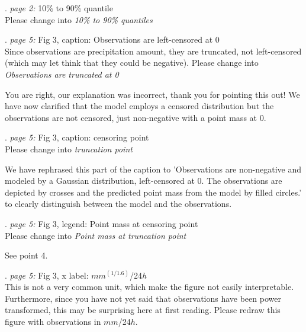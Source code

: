 \documentclass[american,foldmarks=false,noconfig]{uibklttr}
\newenvironment{review}{\fontshape{\itdefault}\fontseries{\bfdefault} \selectfont \smallskip}{\par}
\begin{document}
\begin{review}
2. {\color{quotecolor}\textit{page 2:} 10$\%$ to 90\% quantile}\\
Please change into \textit{10\% to 90\% quantiles}
\end{review}

\begin{review}
3. {\color{quotecolor}\textit{page 5:} Fig 3, caption: Observations 
are left-censored at 0}\\
Since observations are precipitation amount, they are truncated, not 
left-censored (which may let think that they could be negative). 
Please change into \textit{Observations are truncated at 0}
\end{review}

You are right, our explanation was incorrect, thank you for pointing
this out! We have now clarified that the model employs a censored
distribution but the observations are not censored, just non-negative
with a point mass at 0.


\begin{review}
4. {\color{quotecolor}\textit{page 5:} Fig 3, caption: censoring point}\\
Please change into \textit{truncation point}
\end{review}

We have rephrased this part of the caption to 'Observations are non-negative 
and modeled by a Gaussian distribution, left-censored at 0.
The observations are depicted by crosses and the predicted point mass
from the model by filled circles.' to clearly distinguish between the model
and the observations.


\begin{review}
5. {\color{quotecolor}\textit{page 5:} Fig 3, legend: Point mass at 
censoring point}\\
Please change into \textit{Point mass at truncation point}
\end{review}

See point 4.

\begin{review}
6. {\color{quotecolor}\textit{page 5:} Fig 3, x label: $mm^{(1/1.6)}$/24\textit{h}}\\
This is not a very common unit, which make the figure not easily 
interpretable. Furthermore, since you have not yet said that 
observations have been power transformed, this may be surprising 
here at first reading. Please redraw this figure with 
observations in $mm$/24$h$.
\end{review}
\end{document}
